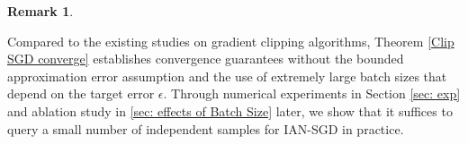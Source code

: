 \documentclass[10pt]{article} %
\newtheorem{remark}{Remark}
\begin{document}
\begin{remark}

\end{remark}
Compared to the existing studies \citep{zhang2020gradientclippingacceleratestraining,zhangLsmoothclip, reisizadeh2023variancereducedclippingnonconvexoptimization,genralclip, usitchclip} on gradient clipping algorithms, Theorem \ref{Clip SGD converge} establishes convergence guarantees without the bounded approximation error assumption and the use of extremely large batch sizes that depend on the target error $\epsilon$.
Through numerical experiments in Section \ref{sec: exp} and ablation study in \ref{sec: effects of Batch Size} later, we show that it suffices to query a small number of independent samples for IAN-SGD in practice.
\end{document}
